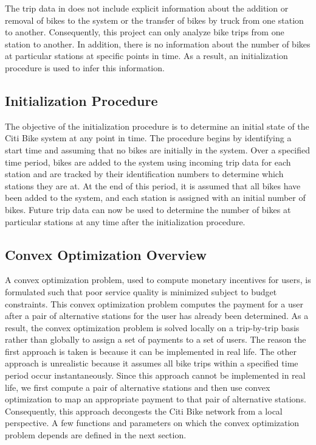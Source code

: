 \documentclass[times, 10pt,twocolumn]{article}
\begin{document}
The trip data in \cite{dataset} does not include explicit information about the addition or removal of bikes to the system or the transfer of bikes by truck from one station to another. Consequently, this project can only analyze bike trips from one station to another. In addition, there is no information about the number of bikes at particular stations at specific points in time. As a result, an initialization procedure is used to infer this information.

\subsection{Initialization Procedure}
The objective of the initialization procedure is to determine an initial state of the Citi Bike system at any point in time. The procedure begins by identifying a start time and assuming that no bikes are initially in the system. Over a specified time period, bikes are added to the system using incoming trip data for each station and are tracked by their identification numbers to determine which stations they are at. At the end of this period, it is assumed that all bikes have been added to the system, and each station is assigned with an initial number of bikes. Future trip data can now be used to determine the number of bikes at particular stations at any time after the initialization procedure.

\subsection{Convex Optimization Overview}

A convex optimization problem, used to compute monetary incentives for users, is formulated such that poor service quality is minimized subject to budget constraints. This convex optimization problem computes the payment for a user after a pair of alternative stations for the user has already been determined. As a result, the convex optimization problem is solved locally on a trip-by-trip basis rather than globally to assign a set of payments to a set of users. The reason the first approach is taken is because it can be implemented in real life. The other approach is unrealistic because it assumes all bike trips within a specified time period occur instantaneously. Since this approach cannot be implemented in real life, we first compute a pair of alternative stations and then use convex optimization to map an appropriate payment to that pair of alternative stations. Consequently, this approach decongests the Citi Bike network from a local perspective. A few functions and parameters on which the convex optimization problem depends are defined in the next section.
\end{document}
